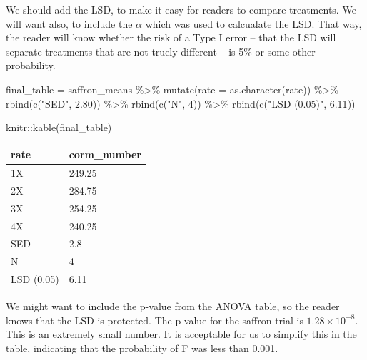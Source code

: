 \documentclass[
]{book}
\newenvironment{Shaded}{\begin{snugshade}}{\end{snugshade}}
\newcommand{\AttributeTok}[1]{\textcolor[rgb]{0.77,0.63,0.00}{#1}}
\newcommand{\DecValTok}[1]{\textcolor[rgb]{0.00,0.00,0.81}{#1}}
\newcommand{\FloatTok}[1]{\textcolor[rgb]{0.00,0.00,0.81}{#1}}
\newcommand{\FunctionTok}[1]{\textcolor[rgb]{0.00,0.00,0.00}{#1}}
\newcommand{\NormalTok}[1]{#1}
\newcommand{\OtherTok}[1]{\textcolor[rgb]{0.56,0.35,0.01}{#1}}
\newcommand{\SpecialCharTok}[1]{\textcolor[rgb]{0.00,0.00,0.00}{#1}}
\newcommand{\StringTok}[1]{\textcolor[rgb]{0.31,0.60,0.02}{#1}}
\begin{document}
We should add the LSD, to make it easy for readers to compare treatments. We will want also, to include the \(\alpha\) which was used to calcualate the LSD. That way, the reader will know whether the risk of a Type I error -- that the LSD will separate treatments that are not truely different -- is 5\% or some other probability.

\begin{Shaded}
\begin{Highlighting}[]
\NormalTok{final\_table }\OtherTok{=}\NormalTok{ saffron\_means }\SpecialCharTok{\%\textgreater{}\%}
  \FunctionTok{mutate}\NormalTok{(}\AttributeTok{rate =} \FunctionTok{as.character}\NormalTok{(rate)) }\SpecialCharTok{\%\textgreater{}\%}
  \FunctionTok{rbind}\NormalTok{(}\FunctionTok{c}\NormalTok{(}\StringTok{"SED"}\NormalTok{, }\FloatTok{2.80}\NormalTok{)) }\SpecialCharTok{\%\textgreater{}\%}
  \FunctionTok{rbind}\NormalTok{(}\FunctionTok{c}\NormalTok{(}\StringTok{"N"}\NormalTok{, }\DecValTok{4}\NormalTok{)) }\SpecialCharTok{\%\textgreater{}\%}
  \FunctionTok{rbind}\NormalTok{(}\FunctionTok{c}\NormalTok{(}\StringTok{"LSD (0.05)"}\NormalTok{, }\FloatTok{6.11}\NormalTok{)) }

\NormalTok{knitr}\SpecialCharTok{::}\FunctionTok{kable}\NormalTok{(final\_table)}
\end{Highlighting}
\end{Shaded}

\begin{tabular}{l|l}
\hline
rate & corm\_number\\
\hline
1X & 249.25\\
\hline
2X & 284.75\\
\hline
3X & 254.25\\
\hline
4X & 240.25\\
\hline
SED & 2.8\\
\hline
N & 4\\
\hline
LSD (0.05) & 6.11\\
\hline
\end{tabular}

We might want to include the p-value from the ANOVA table, so the reader knows that the LSD is protected. The p-value for the saffron trial is \(1.28 \times 10^{-8}\). This is an extremely small number. It is acceptable for us to simplify this in the table, indicating that the probability of F was less than 0.001.
\end{document}
